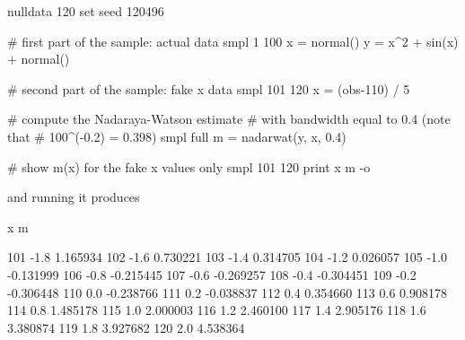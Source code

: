 \begin{code}
nulldata 120
set seed 120496

# first part of the sample: actual data
smpl 1 100
x = normal()
y = x^2 + sin(x) + normal()

# second part of the sample: fake x data
smpl 101 120
x = (obs-110) / 5

# compute the Nadaraya-Watson estimate
# with bandwidth equal to 0.4 (note that
# 100^(-0.2) = 0.398)
smpl full
m = nadarwat(y, x, 0.4)

# show m(x) for the fake x values only
smpl 101 120
print x m -o
\end{code}

and running it produces
\begin{code}
               x            m

101         -1.8     1.165934
102         -1.6     0.730221
103         -1.4     0.314705
104         -1.2     0.026057
105         -1.0    -0.131999
106         -0.8    -0.215445
107         -0.6    -0.269257
108         -0.4    -0.304451
109         -0.2    -0.306448
110          0.0    -0.238766
111          0.2    -0.038837
112          0.4     0.354660
113          0.6     0.908178
114          0.8     1.485178
115          1.0     2.000003
116          1.2     2.460100
117          1.4     2.905176
118          1.6     3.380874
119          1.8     3.927682
120          2.0     4.538364
\end{code}

